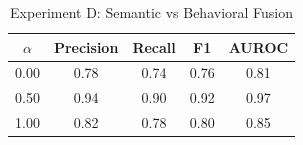 \begin{table}[h]
\centering
\begin{tabular}{|c|c|c|c|c|}
\hline
$\alpha$ & Precision & Recall & F1 & AUROC \\
\hline
0.00 & 0.78 & 0.74 & 0.76 & 0.81 \\
0.50 & 0.94 & 0.90 & 0.92 & 0.97 \\
1.00 & 0.82 & 0.78 & 0.80 & 0.85 \\
\hline
\end{tabular}
\caption{Experiment D: Semantic vs Behavioral Fusion}
\end{table}
